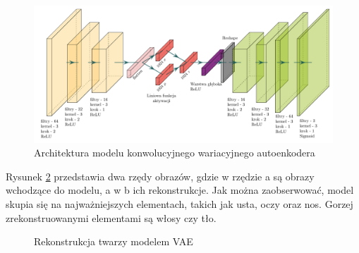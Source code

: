 \documentclass[a4paper,12pt,oneside]{book} %
\begin{document}
\begin{figure}[h!]
	\centering\includegraphics[width=\linewidth]{my_arch.pdf}
	\caption{Architektura modelu konwolucyjnego wariacyjnego autoenkodera}
	\label{fig:convvae}
\end{figure}

Rysunek \ref{fig:vaefacerecon} przedstawia dwa rzędy obrazów, gdzie w rzędzie a są obrazy wchodzące do modelu, a w b ich rekonstrukcje. Jak można zaobserwować, model skupia się na najważniejszych elementach, takich jak usta, oczy oraz nos. Gorzej zrekonstruowanymi elementami są włosy czy tło. 
\newpage
\begin{figure}[h!]
	\centering
	\caption{Rekonstrukcja twarzy modelem VAE}
	\label{fig:vaefacerecon}
\end{figure}
\end{document}
